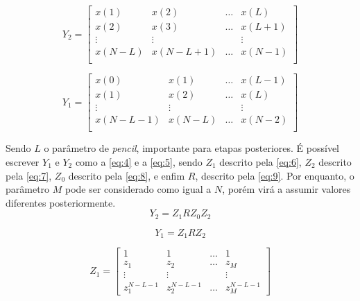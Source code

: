 \documentclass[12pt]{article}
\begin{document}
\begin{equation} \label{eq:2}
    Y_2 = \begin{bmatrix} x(1) & x(2) & \dots & x(L) \\
                            x(2) & x(3) & \dots & x(L + 1) \\
                            \vdots & \vdots & & \vdots \\
                            x(N-L) & x(N - L + 1) & \dots & x(N-1) \\
    \end{bmatrix}
\end{equation}

\begin{equation} \label{eq:3}
    Y_1 = \begin{bmatrix} x(0) & x(1) & \dots & x(L-1) \\
                            x(1) & x(2) & \dots & x(L) \\
                            \vdots & \vdots & & \vdots \\
                            x(N - L - 1) & x(N - L) & \dots & x(N-2) \\
    \end{bmatrix}
\end{equation}

Sendo $L$ o parâmetro de \textit{pencil}, importante para etapas posteriores. É possível escrever $Y_1$ e $Y_2$ como a \autoref{eq:4} e a \autoref{eq:5}, sendo $Z_1$ descrito pela \autoref{eq:6}, $Z_2$ descrito pela \autoref{eq:7}, $Z_0$ 
descrito pela \autoref{eq:8}, e enfim $R$, descrito pela \autoref{eq:9}. Por enquanto, o parâmetro $M$ pode ser considerado como igual a $N$, porém virá a assumir valores diferentes posteriormente.
\begin{equation} \label{eq:4}
    Y_2 = Z_1 R Z_0 Z_2
\end{equation}

\begin{equation} \label{eq:5}
    Y_1 = Z_1 R Z_2
\end{equation}

\begin{equation} \label{eq:6}
    Z_1 = \begin{bmatrix} 1 & 1 & \dots & 1 \\
                            z_1 & z_2 & \dots & z_M \\
                            \vdots & \vdots & & \vdots \\
                            z_1^{N - L - 1} & z_2^{N - L - 1} & \dots & z_M^{N - L - 1} 
    \end{bmatrix}  
\end{equation}
\end{document}
